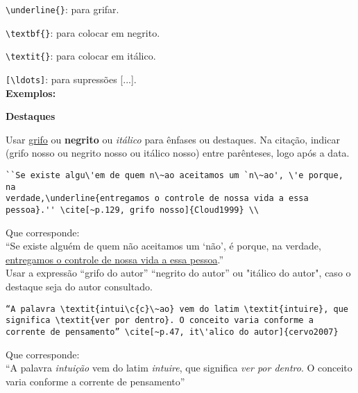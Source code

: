 \verb+\underline{}+: para grifar.

\verb+\textbf{}+: para colocar em negrito.

\verb+\textit{}+: para colocar em it\'alico.

\verb+[\ldots]+: para supress\~oes [...]. \\

\textbf{Exemplos:}

\begin{alineas}
\item

\textbf{Destaques}

Usar \underline{grifo} ou \textbf{negrito} ou \textit{it\'alico} para \^enfases ou destaques. Na cita\c{c}\~ao, indicar (grifo nosso ou negrito nosso ou it\'alico nosso) entre par\^enteses, logo ap\'os a data.

\begin{verbatim}
``Se existe algu\'em de quem n\~ao aceitamos um `n\~ao', \'e porque, na 
verdade,\underline{entregamos o controle de nossa vida a essa 
pessoa}.'' \cite[~p.129, grifo nosso]{Cloud1999} \\
\end{verbatim}	

Que corresponde: \\

``Se existe algu\'em de quem n\~ao aceitamos um `n\~ao', \'e porque, na verdade,
\underline{entregamos o controle de nossa vida a essa pessoa}.'' \cite[~p.129, grifo nosso]{Cloud1999} \\

Usar a express\~ao “grifo do autor” “negrito do autor” ou "it\'alico do autor", caso o destaque seja do autor consultado.

\begin{verbatim}
“A palavra \textit{intui\c{c}\~ao} vem do latim \textit{intuire}, que 
significa \textit{ver por dentro}. O conceito varia conforme a
corrente de pensamento” \cite[~p.47, it\'alico do autor]{cervo2007}
\end{verbatim}

Que corresponde: \\

“A palavra \textit{intui\c{c}\~ao} vem do latim \textit{intuire}, que 
significa \textit{ver por dentro}. O conceito varia conforme a
corrente de pensamento” \cite[~p.47, it\'alico do autor]{cervo2007}\\

\item


\end{alineas}
